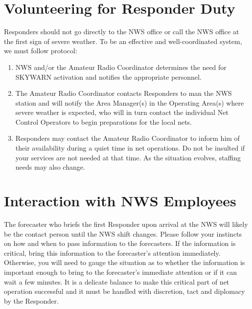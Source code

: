 \documentclass[pdflatex,letterpaper,twoside,12pt]{book}
\begin{document}

\section{Volunteering for Responder Duty}

Responders should not go directly to the NWS office or call the NWS office at the first sign of severe weather. To be an effective and well-coordinated system, we must follow protocol: 

\begin{enumerate}
\item NWS and/or the Amateur Radio Coordinator determines the need for SKYWARN activation and notifies the appropriate personnel. 
\item The Amateur Radio Coordinator contacts Responders to man the NWS station and will notify the Area Manager(s) in the Operating Area(s) where severe weather is expected, who will in turn contact the individual Net Control Operators to begin preparations for the local nets. 
\item Responders may contact the Amateur Radio Coordinator to inform him of their availability during a quiet time in net operations.  Do not be insulted if your services are not needed at that time. As the situation evolves, staffing needs may also change.
\end{enumerate}



\section{Interaction with NWS Employees}

The forecaster who briefs the first Responder upon arrival at the NWS will likely be the contact person until the NWS shift changes.  Please follow your instincts on how and when to pass information to the forecasters. If the information is critical, bring this information to the forecaster's attention immediately.  Otherwise, you will need to gauge the situation as to whether the information is important enough to bring to the forecaster's immediate attention or if it can wait a few minutes.  It is a delicate balance to make this critical part of net operation successful and it must be handled with discretion, tact and diplomacy by the Responder.
\end{document}
